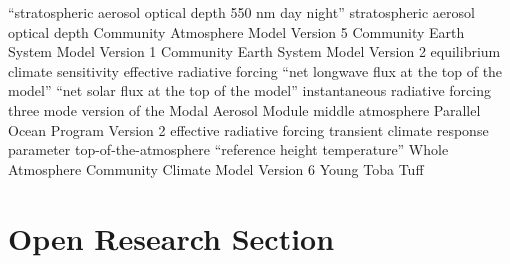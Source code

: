 \documentclass[draft]{agujournal2019}
\begin{document}
\begin{acronyms}
   ``stratospheric aerosol optical depth 550 nm day night'' 
  stratospheric aerosol optical depth  Community Atmosphere Model Version 5
   Community Earth System Model Version 1  Community Earth
  System Model Version 2  equilibrium climate sensitivity  effective
  radiative forcing  ``net longwave flux at the top of the model''
   ``net solar flux at the top of the model''  instantaneous
  radiative forcing  three mode version of the Modal Aerosol Module 
  middle atmosphere  Parallel Ocean Program Version 2  effective
  radiative forcing  transient climate response parameter 
  top-of-the-atmosphere  ``reference height temperature'' 
  Whole Atmosphere Community Climate Model Version 6  Young Toba Tuff
\end{acronyms}


%
%

\section*{Open Research Section}

\end{document}
